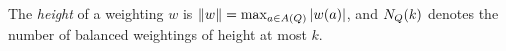 \begin{definition}[Height]\label{sh-000B}
The \emph{height} of a weighting $w$ is $\|w\| = \max_{a \in A(Q)} |w(a)|$, and $N_{Q}(k)$ denotes the number of balanced weightings of height at most $k$.
\end{definition}